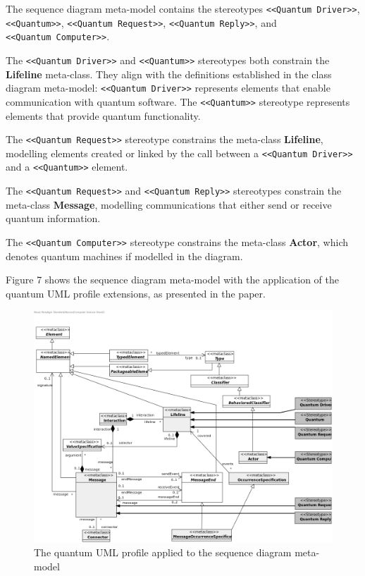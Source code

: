 \documentclass{article}
\newcounter{subsubsubsection}[subsubsection]
\begin{document}

The sequence diagram meta-model contains the stereotypes \texttt{<<Quantum Driver>>}, \texttt{<<Quantum>>}, \texttt{<<Quantum Request>>}, \texttt{<<Quantum Reply>>}, and \\ \texttt{<<Quantum Computer>>}.

The \texttt{<<Quantum Driver>>} and \texttt{<<Quantum>>} stereotypes both constrain the \textbf{Lifeline} meta-class. They align with the definitions established in the class diagram meta-model: \texttt{<<Quantum Driver>>} represents elements that enable communication with quantum software. The \texttt{<<Quantum>>} stereotype represents elements that provide quantum functionality.

The \texttt{<<Quantum Request>>} stereotype constrains the meta-class \textbf{Lifeline}, modelling elements created or linked by the call between a \texttt{<<Quantum Driver>>} and a \texttt{<<Quantum>>} element\cite{Pérez-Castillo2022}.

The \texttt{<<Quantum Request>>} and \texttt{<<Quantum Reply>>} stereotypes constrain the meta-class \textbf{Message}, modelling communications that either send or receive quantum information\cite{Pérez-Castillo2022}.

The \texttt{<<Quantum Computer>>} stereotype constrains the meta-class \textbf{Actor}, which denotes quantum machines if modelled in the diagram.

Figure 7 shows the sequence diagram meta-model with the application of the quantum UML profile extensions, as presented in the paper.

\begin{figure}
    \centering
    \includegraphics[width=1\linewidth]{QuantumUMLProfile-SequenceDiagram.png}
    \caption{The quantum UML profile applied to the sequence diagram meta-model\cite{PerezCastillo2021Git}}
    \label{fig:QUMLPD_SD}
\end{figure}
\end{document}
